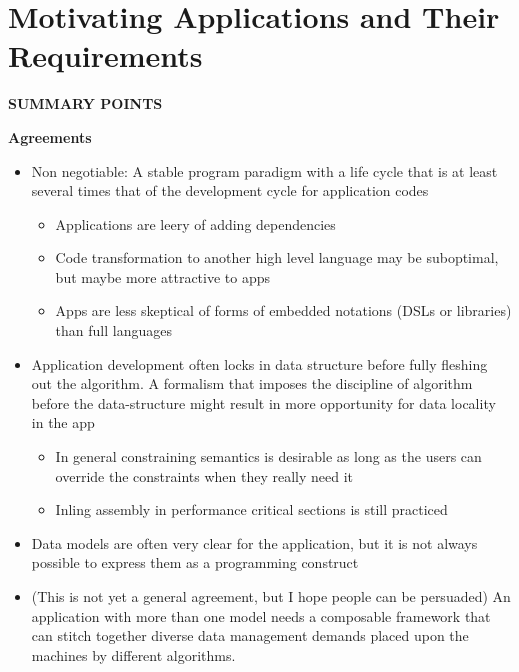 \chapter{Motivating Applications and Their Requirements}
\label{ch:apps}

\newcommand{\hipacc}{\textsf{HIPA\nolinebreak[4]\hspace{-0.1em}\textsuperscript{cc}}}

%
%
\noindent
{\large\textbf{SUMMARY POINTS}}

$ $\\
\noindent
\textbf{Agreements}
\begin{itemize}
  \item Non negotiable: A stable program paradigm with a life cycle that is at least several times that of the development cycle for application codes
    \begin{itemize}
      \item Applications are leery of adding dependencies
      \item Code transformation to another high level language may be suboptimal, but maybe more attractive to apps
      \item Apps are less skeptical of forms of embedded notations (DSLs or libraries) than full languages
    \end{itemize}
  \item Application development often locks in data structure before fully fleshing out the algorithm.
    A formalism that imposes the discipline of algorithm before the data-structure might result in more opportunity for data locality in the app
    \begin{itemize}
      \item In general constraining semantics is desirable as long as the users can override the constraints when they really need it
      \item Inling assembly in performance critical sections is still practiced
    \end{itemize}
  \item Data models are often very clear for the application, but it is not always possible to express them as a programming construct
  \item (This is not yet a general agreement, but I hope people can be persuaded)
    An application with more than one model needs a composable framework that can stitch together diverse data management demands placed upon the machines by different algorithms.

\end{itemize}
